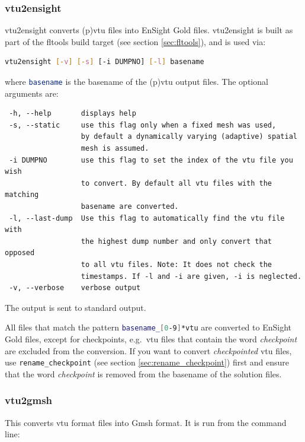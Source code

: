 
\subsubsection{vtu2ensight}
\label{sec:vtu2ensight}

vtu2ensight converts (p)vtu files into EnSight Gold files. vtu2ensight is built as part of the fltools
build target (see section \ref{sec:fltools}), and is used via:

\begin{lstlisting}[language = Bash]
vtu2ensight [-v] [-s] [-i DUMPNO] [-l] basename
\end{lstlisting}

where \lstinline[language = Bash]+basename+ is the basename of the (p)vtu output files. The optional arguments are:
\begin{lstlisting}
 -h, --help       displays help
 -s, --static     use this flag only when a fixed mesh was used,
                  by default a dynamically varying (adaptive) spatial
                  mesh is assumed.
 -i DUMPNO        use this flag to set the index of the vtu file you wish
                  to convert. By default all vtu files with the matching
                  basename are converted.
 -l, --last-dump  Use this flag to automatically find the vtu file with
                  the highest dump number and only convert that opposed
                  to all vtu files. Note: It does not check the
                  timestamps. If -l and -i are given, -i is neglected.
 -v, --verbose    verbose output
\end{lstlisting}

The output is sent to standard output.

All files that match the pattern \lstinline[language = Bash]+basename_[0-9]*vtu+ are converted to EnSight Gold files, except for checkpoints, e.g.~vtu files that contain the word \textsl{checkpoint} are excluded from the conversion. If you want to convert \textsl{checkpointed} vtu files, use \lstinline[language = Bash]+rename_checkpoint+ (see section \ref{sec:rename_checkpoint}) first and ensure that the word \textsl{checkpoint} is removed from the basename of the solution files.


\subsubsection{vtu2gmsh}
\label{sec:vtu2gmsh}
This converts vtu format files into Gmsh format. It is run from the command line:

